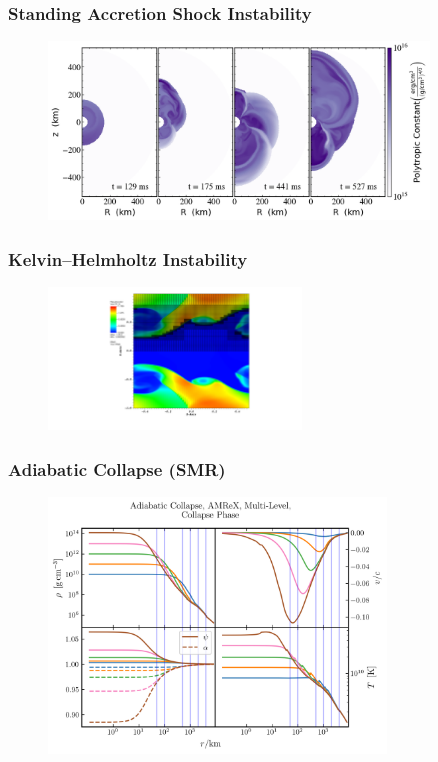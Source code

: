 \documentclass{beamer}
\begin{document}
\begin{frame}
\frametitle{Standing Accretion Shock Instability}

  \begin{figure}[htb!]
    \centering
    \includegraphics[width=0.9\textwidth]{fig.sasi.png}
  \end{figure}

\end{frame}

\begin{frame}
\frametitle{Kelvin--Helmholtz Instability}

  \begin{figure}[htb!]
    \centering
    \includegraphics[width=0.6\textwidth]{fig.KHI.pdf}
  \end{figure}

\end{frame}

\begin{frame}
\frametitle{Adiabatic Collapse (SMR)}

  \begin{figure}[htb!]
    \centering
    \includegraphics[width=0.8\textwidth]{fig.Collapse.png}
  \end{figure}

\end{frame}
\end{document}
